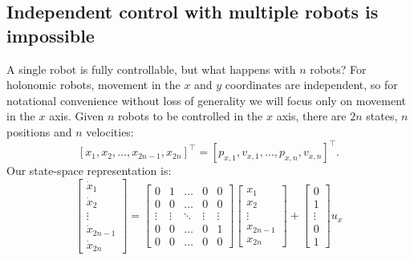 \subsection{Independent control with multiple robots is impossible}
A single robot is fully controllable, but what happens with $n$ robots? For holonomic robots, movement in the $x$ and $y$ coordinates are independent, so for notational convenience without loss of generality we will focus only on movement in the $x$ axis. Given $n$ robots to be  controlled in the $x$ axis, there are $2n$ states, $n$ positions and $n$ velocities:
\begin{equation}\left[ x_1,x_2,\ldots, x_{2n-1},x_{2n}\right]^\intercal = \left[ p_{x,1},v_{x,1},\ldots,p_{x,n},v_{x,n}\right]^\intercal. \nonumber\end{equation}
Our state-space representation is:
\begin{equation}
\begin{bmatrix}
\dot{x}_1\\ 
\dot{x}_2\\
\vdots\\
\dot{x}_{2n-1}\\
\dot{x}_{2n}

\end{bmatrix} = \begin{bmatrix}
0 & 1 & \ldots & 0 & 0 \\
0 & 0 & \ldots& 0 & 0 \\
\vdots &  \vdots & \ddots & \vdots & \vdots \\
0 & 0  & \ldots & 0 & 1 \\
0 & 0 & \ldots& 0 & 0 
\end{bmatrix}  \begin{bmatrix}
x_1\\
x_2\\
\vdots \\
x_{2n-1}\\
x_{2n}
\end{bmatrix} + \begin{bmatrix}
0\\
1\\
\vdots\\
0\\
1
\end{bmatrix} u_x
\end{equation}
